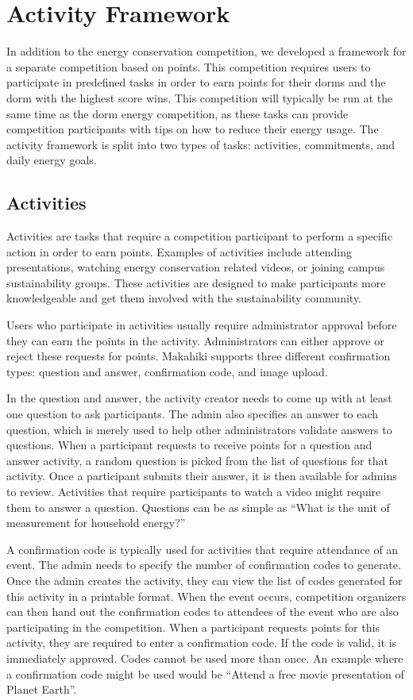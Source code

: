 \section{Activity Framework}
\label{activity}

In addition to the energy conservation competition, we developed a framework for a separate competition based on points.  This competition requires users to participate in predefined tasks in order to earn points for their dorms and the dorm with the highest score wins.  This competition will typically be run at the same time as the dorm energy competition, as these tasks can provide competition participants with tips on how to reduce their energy usage.  The activity framework is split into two types of tasks: activities, commitments, and daily energy goals.

\subsection{Activities}

Activities are tasks that require a competition participant to perform a specific action in order to earn points.  Examples of activities include attending presentations, watching energy conservation related videos, or joining campus sustainability groups.  These activities are designed to make participants more knowledgeable and get them involved with the sustainability community.

Users who participate in activities usually require administrator approval before they can earn the points in the activity.  Administrators can either approve or reject these requests for points.  Makahiki supports three different confirmation types: question and answer, confirmation code, and image upload.

In the question and answer, the activity creator needs to come up with at least one question to ask participants.  The admin also specifies an answer to each question, which is merely used to help other administrators validate answers to questions.  When a participant requests to receive points for a question and answer activity, a random question is picked from the list of questions for that activity.  Once a participant submits their answer, it is then available for admins to review.  Activities that require participants to watch a video might require them to answer a question.  Questions can be as simple as ``What is the unit of measurement for household energy?''

A confirmation code is typically used for activities that require attendance of an event.  The admin needs to specify the number of confirmation codes to generate.  Once the admin creates the activity, they can view the list of codes generated for this activity in a printable format.  When the event occurs, competition organizers can then hand out the confirmation codes to attendees of the event who are also participating in the competition.  When a participant requests points for this activity, they are required to enter a confirmation code.  If the code is valid, it is immediately approved.  Codes cannot be used more than once.  An example where a confirmation code might be used would be ``Attend a free movie presentation of Planet Earth''.

